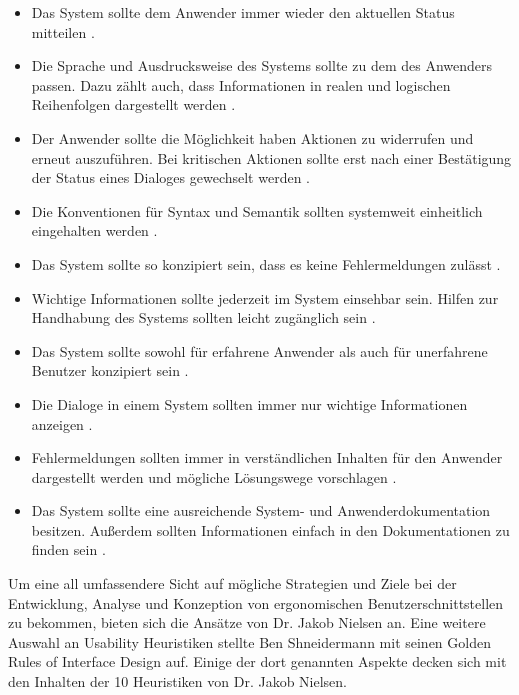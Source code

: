 \begin{itemize}
    \item Das System sollte dem Anwender immer wieder den aktuellen Status mitteilen \citep[vgl.][]{Nielsen1995}.
    \item Die Sprache und Ausdrucksweise des Systems sollte zu dem des Anwenders passen. Dazu zählt auch, dass Informationen in realen und logischen Reihenfolgen dargestellt werden \citep[vgl.][]{Nielsen1995}.
    \item Der Anwender sollte die Möglichkeit haben Aktionen zu widerrufen und erneut auszuführen. Bei kritischen Aktionen sollte erst nach einer Bestätigung der Status eines Dialoges gewechselt werden \citep[vgl.][]{Nielsen1995}.
    \item Die Konventionen für Syntax und Semantik sollten systemweit einheitlich eingehalten werden \citep[vgl.][]{Nielsen1995}.
    \item Das System sollte so konzipiert sein, dass es keine Fehlermeldungen zulässt \citep[vgl.][]{Nielsen1995}.
    \item Wichtige Informationen sollte jederzeit im System einsehbar sein. Hilfen zur Handhabung des Systems sollten leicht zugänglich sein \citep[vgl.][]{Nielsen1995}.
    \item Das System sollte sowohl für erfahrene Anwender als auch für unerfahrene Benutzer konzipiert sein \citep[vgl.][]{Nielsen1995}.
    \item Die Dialoge in einem System sollten immer nur wichtige Informationen anzeigen \citep[vgl.][]{Nielsen1995}.
    \item Fehlermeldungen sollten immer in verständlichen Inhalten für den Anwender dargestellt werden und mögliche Lösungswege vorschlagen \citep[vgl.][]{Nielsen1995}.
    \item Das System sollte eine ausreichende System- und Anwenderdokumentation besitzen. Außerdem sollten Informationen einfach in den Dokumentationen zu finden sein \citep[vgl.][]{Nielsen1995}.
\end{itemize}

Um eine all umfassendere Sicht auf mögliche Strategien und Ziele bei der Entwicklung, Analyse und Konzeption von ergonomischen Benutzerschnittstellen zu bekommen, bieten sich die Ansätze von Dr. Jakob Nielsen an. Eine weitere Auswahl an Usability Heuristiken stellte Ben Shneidermann mit seinen  Golden Rules of Interface Design \grqq{} \citep{Wong2018} auf. Einige der dort genannten Aspekte decken sich mit den Inhalten der 10 Heuristiken von Dr. Jakob Nielsen.

